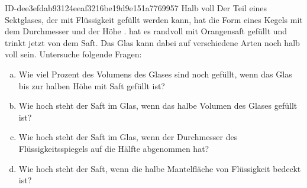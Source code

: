 \begin{exercise}
      {ID-dee3efdab93124eeaf3216be19d9e151a7769957}
      {Halb voll}
  \ifproblem\problem
    Der Teil eines Sektglases, der mit Flüssigkeit gefüllt werden kann,
    hat die Form eines Kegels mit dem Durchmesser  und der
    Höhe . \xxa{} hat es randvoll mit Orangensaft gefüllt
    und trinkt jetzt von dem Saft. Das Glas kann dabei auf verschiedene
    Arten noch \glqq halb voll\grqq{} sein. Untersuche folgende Fragen:
    \begin{enumerate}[a)]
      \item Wie viel Prozent des Volumens des Glases sind noch gefüllt,
            wenn das Glas bis zur halben Höhe mit Saft gefüllt ist?
      \item Wie hoch steht der Saft im Glas, wenn das halbe Volumen
            des Glases gefüllt ist?
      \item Wie hoch steht der Saft im Glas, wenn der Durchmesser des
            Flüssigkeitsspiegels auf die Hälfte abgenommen hat?
      \item Wie hoch steht der Saft, wenn die halbe Mantelfläche
            von Flüssigkeit bedeckt ist?
    \end{enumerate}
  \fi
\end{exercise}
